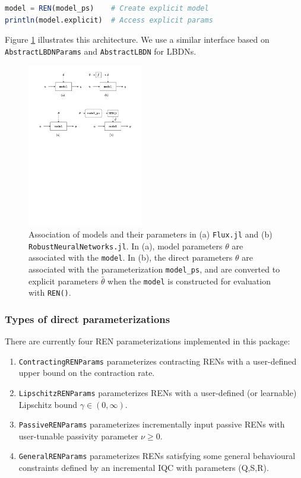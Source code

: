 \begin{lstlisting}[language = Julia]
model = REN(model_ps)    # Create explicit model
println(model.explicit)  # Access explicit params
\end{lstlisting}

Figure \ref{fig:ren-params} illustrates this architecture. We use a similar interface based on \verb|AbstractLBDNParams| and \verb|AbstractLBDN| for LBDNs.

\begin{figure}[ht]
    \centering
    \includegraphics[width=0.45\textwidth]{Images/rrn_julia_params.pdf}
    \caption{Association of models and their parameters in (a) \texttt{Flux.jl} and (b) \texttt{RobustNeuralNetworks.jl}. In (a), model parameters $\theta$ are associated with the \texttt{model}. In (b), the direct parameters $\theta$ are associated with the parameterization \texttt{model\_ps}, and are converted to explicit parameters $\bar{\theta}$ when the \texttt{model} is constructed for evaluation with \texttt{REN()}.}
    \label{fig:ren-params}
\end{figure}

\subsubsection{Types of direct parameterizations} \label{sec:direct-params}

There are currently four REN parameterizations implemented in this package:
\begin{enumerate}
    \item \verb|ContractingRENParams| parameterizes contracting RENs with a user-defined upper bound on the contraction rate.

    \item \verb|LipschitzRENParams| parameterizes RENs with a user-defined (or learnable) Lipschitz bound $\gamma \in (0,\infty)$.

    \item \verb|PassiveRENParams| parameterizes incrementally input passive RENs with user-tunable passivity parameter $\nu \ge 0$.

    \item \verb|GeneralRENParams| parameterizes RENs satisfying some general behavioural constraints defined by an incremental IQC with parameters (Q,S,R).
    
\end{enumerate}

